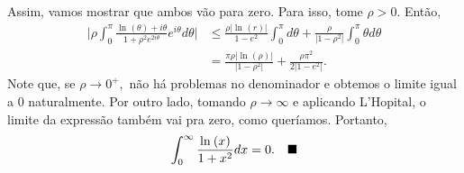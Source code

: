 \documentclass[ComplexAnalysis/complex.tex]{subfiles}
\begin{document}
\begin{exer*}
\[	\]
	Assim, vamos mostrar que ambos vão para zero. Para isso, tome \(\rho > 0\). Então,
	\begin{align*}
		\biggl\vert \rho \int_{0}^{\pi }\frac{\ln^{}{(\theta )} + i\theta }{1 + \rho ^{2}e^{2i\theta }}e^{i\theta }d\theta  \biggr\vert & \leq \frac{\rho |\ln^{}{(r)}|}{1-e^{2}}\int_{0}^{\pi }d\theta + \frac{\rho }{|1-\rho ^{2}|}\int_{0}^{\pi }\theta d\theta \\
		                                                                                                                                & = \frac{\pi \rho |\ln^{}{(\rho )}|}{|1-\rho ^{2}|} + \frac{\rho \pi ^{2}}{2|1-e^{2}|}.
	\end{align*}
	Note que, se \(\rho\to 0^{+},\) não há problemas no denominador e obtemos o limite igual a 0 naturalmente. Por outro lado, tomando
	\(\rho \to \infty\) e aplicando L'Hopital, o limite da expressão também vai pra zero, como queríamos. Portanto,
	\[
		\int_{0}^{\infty}\frac{\ln^{}{(x)}}{1 + x^{2}}dx = 0.\quad \text{$\blacksquare$}
	\]
\end{exer*}
\end{document}
